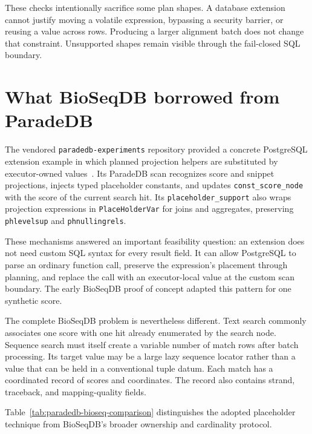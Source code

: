 These checks intentionally sacrifice some plan shapes.  A database extension
cannot justify moving a volatile expression, bypassing a security barrier, or
reusing a value across rows.  Producing a larger alignment batch does not
change that constraint.  Unsupported shapes remain visible through the
fail-closed SQL boundary.

\section{What BioSeqDB borrowed from ParadeDB}
\label{sec:paradedb-customscan-comparison}

The vendored \texttt{paradedb-experiments} repository provided a concrete
PostgreSQL extension example in which planned projection helpers are
substituted by executor-owned values~\cite{paradedb_pg_search_customscan}.
Its ParadeDB scan recognizes score and snippet projections, injects typed
placeholder constants, and updates \texttt{const\_score\_node} with the score
of the current search hit.  Its \texttt{placeholder\_support} also wraps
projection expressions in \texttt{PlaceHolderVar} for joins and aggregates,
preserving \texttt{phlevelsup} and \texttt{phnullingrels}.

These mechanisms answered an important feasibility question: an extension
does not need custom SQL syntax for every result field.  It can allow
PostgreSQL to parse an ordinary function call, preserve the expression's
placement through planning, and replace the call with an executor-local
value at the custom scan boundary.  The early BioSeqDB proof of concept
adapted this pattern for one synthetic score.

The complete BioSeqDB problem is nevertheless different.  Text search
commonly associates one score with one hit already enumerated by the search
node.  Sequence search must itself create a variable number of match rows
after batch processing.  Its target value may be a large lazy sequence
locator rather than a value that can be held in a conventional tuple datum.
Each match has a coordinated record of scores and coordinates.  The record
also contains strand, traceback, and mapping-quality fields.

Table~\ref{tab:paradedb-bioseq-comparison} distinguishes the adopted
placeholder technique from BioSeqDB's broader ownership and cardinality
protocol.

